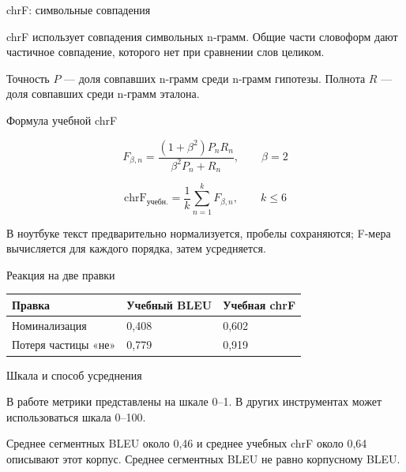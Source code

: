 \documentclass[aspectratio=169,12pt]{beamer}
\begin{document}
\begin{frame}{chrF: символьные совпадения}
\color{ink}
{\small chrF использует совпадения символьных n-грамм. Общие части словоформ дают частичное совпадение, которого нет при сравнении слов целиком.
\par\vspace{0.6em}Точность $P$ — доля совпавших n-грамм среди n-грамм гипотезы. Полнота $R$ — доля совпавших среди n-грамм эталона.}
\end{frame}

\begin{frame}{Формула учебной chrF}
\color{ink}
{\small \[\displaystyle F_{\beta,n}=\frac{(1+\beta^2)P_nR_n}{\beta^2P_n+R_n},\qquad\beta=2\]
\par\vspace{0.6em}\[\displaystyle \mathrm{chrF}_{\text{учебн.}}=\frac1k\sum_{n=1}^{k}F_{\beta,n},\qquad k\le6\]
\par\vspace{0.6em}В ноутбуке текст предварительно нормализуется, пробелы сохраняются; F-мера вычисляется для каждого порядка, затем усредняется.}
\end{frame}

\begin{frame}{Реакция на две правки}
\color{ink}
{\small\renewcommand{\arraystretch}{1.15}\begin{tabular}{@{}Л{0.46} Л{0.23} Л{0.23}@{}}\toprule
Правка & Учебный BLEU & Учебная chrF\\\midrule
Номинализация & 0,408 & 0,602\\[0.15em]
Потеря частицы «не» & 0,779 & 0,919\\[0.15em]\bottomrule\end{tabular}}
\end{frame}

\begin{frame}{Шкала и способ усреднения}
\color{ink}
{\small В работе метрики представлены на шкале 0–1. В других инструментах может использоваться шкала 0–100.
\par\vspace{0.6em}Среднее сегментных BLEU около 0,46 и среднее учебных chrF около 0,64 описывают этот корпус. Среднее сегментных BLEU не равно корпусному BLEU.}
\end{frame}
\end{document}
